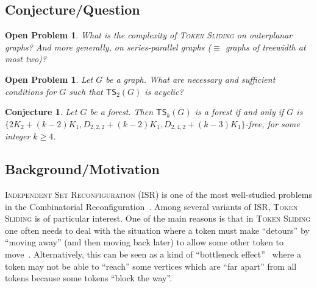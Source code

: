 \documentclass[a4paper]{article}
\newtheorem{conjecture}[theorem]{Conjecture}
\newtheorem{problem}[theorem]{Open Problem}
\theoremstyle{definition}
\theoremstyle{remark}
\numberwithin{equation}{section}
\begin{document}
\subsection{Conjecture/Question}

\begin{problem}\label{ISR-TS-tw2graph}
	What is the complexity of \textsc{Token Sliding} on outerplanar graphs? And more generally, on series-parallel graphs ($\equiv$ graphs of treewidth at most two)?
\end{problem}

\begin{problem}\label{ISR-acyclic-TS2graph}
	Let $G$ be a graph.
	What are necessary and sufficient conditions for $G$ such that $\mathsf{TS}_2(G)$ is acyclic?
\end{problem}

\begin{conjecture}\label{ISR-acyclic-TSkgraph}
	Let $G$ be a forest.
	Then $\mathsf{TS}_k(G)$ is a forest if and only if $G$ is $\{2K_2 + (k-2)K_1, D_{2,2,2} + (k-2)K_1, D_{2,4,2} + (k-3)K_1\}$-free, for some integer $k \geq 4$.
\end{conjecture}

\subsection{Background/Motivation}

\textsc{Independent Set Reconfiguration (ISR)} is one of the most well-studied problems in the Combinatorial Reconfiguration~\cite{journals/algorithms/Nishimura18,journals/corr/BousquetMNS22}.
Among several variants of \textsc{ISR}, \textsc{Token Sliding} is of particular interest.
One of the main reasons is that in \textsc{Token Sliding} one often needs to deal with the situation where a token must make ``detours'' by ``moving away'' (and then moving back later) to allow some other token to move~\cite{journals/tcs/DemaineDFHIOOUY15}. Alternatively, this can be seen as a kind of ``bottleneck effect''~\cite{conf/esa/BartierBM22} where a token may not be able to ``reach'' some vertices which are ``far apart'' from all tokens because some tokens ``block the way''.
\end{document}
